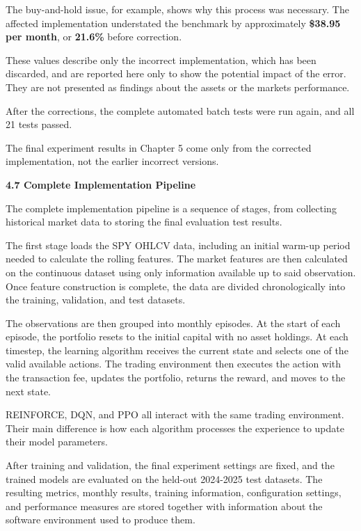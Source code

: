 The buy-and-hold issue, for example, shows why this process was
necessary. The affected implementation understated the benchmark by
approximately \textbf{\$38.95 per month}, or \textbf{21.6\%} before
correction.

These values describe only the incorrect implementation, which has been
discarded, and are reported here only to show the potential impact of
the error. They are not presented as findings about the
asset\textquotesingle s or the market\textquotesingle s performance.

After the corrections, the complete automated batch tests were run
again, and all 21 tests passed.

The final experiment results in Chapter 5 come only from the corrected
implementation, not the earlier incorrect versions.

\textbf{4.7 Complete Implementation Pipeline}

The complete implementation pipeline is a sequence of stages, from
collecting historical market data to storing the final evaluation test
results.

The first stage loads the SPY OHLCV data, including an initial warm-up
period needed to calculate the rolling features. The market features are
then calculated on the continuous dataset using only information
available up to said observation. Once feature construction is complete,
the data are divided chronologically into the training, validation, and
test datasets.

The observations are then grouped into monthly episodes. At the start of
each episode, the portfolio resets to the initial capital with no asset
holdings. At each timestep, the learning algorithm receives the current
state and selects one of the valid available actions. The trading
environment then executes the action with the transaction fee, updates
the portfolio, returns the reward, and moves to the next state.

REINFORCE, DQN, and PPO all interact with the same trading environment.
Their main difference is how each algorithm processes the experience to
update their model parameters.

After training and validation, the final experiment settings are fixed,
and the trained models are evaluated on the held-out 2024-2025 test
datasets. The resulting metrics, monthly results, training information,
configuration settings, and performance measures are stored together
with information about the software environment used to produce them.

